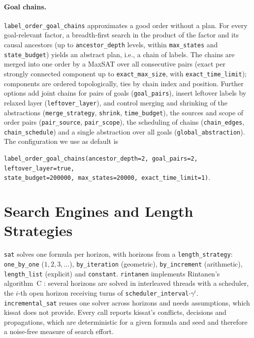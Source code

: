 \documentclass[manuscript, screen]{jair}
\newcommand{\opt}[1]{\texttt{#1}}
\begin{document}
\paragraph{Goal chains.} \opt{label\_order\_goal\_chains} approximates a good order without a plan.
For every goal-relevant factor, a breadth-first search in the product of the factor and its causal
ancestors (up to \opt{ancestor\_depth} levels, within \opt{max\_states} and \opt{state\_budget})
yields an abstract plan, i.e., a chain of labels. The chains are merged into one order by a MaxSAT
over all consecutive pairs (exact per strongly connected component up to \opt{exact\_max\_size}, with
\opt{exact\_time\_limit}); components are ordered topologically, ties by chain index and position.
Further options add joint chains for pairs of goals (\opt{goal\_pairs}), insert leftover labels by
relaxed layer (\opt{leftover\_layer}), and control merging and shrinking of the abstractions
(\opt{merge\_strategy}, \opt{shrink}, \opt{time\_budget}), the sources and scope of order pairs
(\opt{pair\_source}, \opt{pair\_scope}), the scheduling of chains (\opt{chain\_edges},
\opt{chain\_schedule}) and a single abstraction over all goals (\opt{global\_abstraction}). The
configuration we use as default is
\begin{center}
\texttt{label\_order\_goal\_chains(ancestor\_depth=2, goal\_pairs=2, leftover\_layer=true,\\
state\_budget=200000, max\_states=20000, exact\_time\_limit=1)}.
\end{center}

\section{Search Engines and Length Strategies}\label{sec:engines}

\opt{sat} solves one formula per horizon, with horizons from a \opt{length\_strategy}:
\opt{one\_by\_one} ($1,2,3,\dots$), \opt{by\_iteration} (geometric), \opt{by\_increment} (arithmetic),
\opt{length\_list} (explicit) and \opt{constant}. \opt{rintanen} implements Rintanen's algorithm~C
\parencite{rintanen-et-al-aij2006}: several horizons are solved in interleaved threads with a
scheduler, the $i$-th open horizon receiving turns of \opt{scheduler\_interval}$\cdot\gamma^i$.
\opt{incremental\_sat} reuses one solver across horizons and needs assumptions, which kissat
\parencite{kissat} does not provide. Every call reports kissat's conflicts, decisions and
propagations, which are deterministic for a given formula and seed and therefore a noise-free
measure of search effort.
\end{document}
